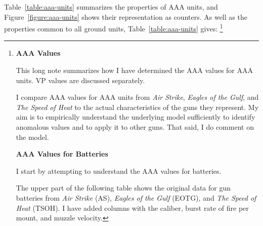 \documentclass[10pt]{article}
\newcommand{\note}[1]{%
    \footnote{%
        \setlength{\parindent}{0pt}%
        \setlength{\parskip}{\smallskipamount}%
        #1
    }%
}
\newcommand{\notesection}[1]{%
    \par{\bfseries #1}\par
}
\begin{document}
Table~\ref{table:aaa-units} summarizes the properties of AAA units, and Figure~\ref{figure:aaa-units} shows their representation as counters.
As well as the properties common to all ground units, Table~\ref{table:aaa-units} gives:%
\note{
    \notesection{AAA Values}

    This long note summarizes how I have determined the AAA values for AAA units. VP values are discussed separately.

    I compare AAA values for AAA units from \emph{Air Strike}, \emph{Eagles of the Gulf}, and \emph{The Speed of Heat} to the actual characteristics of the guns they represent. My aim is to empirically understand the underlying model sufficiently to identify anomalous values and to apply it to other guns. That said, I do comment on the model.

    \notesection{AAA Values for Batteries}

    I start by attempting to understand the AAA values for batteries.

    The upper part of the following table shows the original data for gun batteries from \emph{Air Strike} (AS), \emph{Eagles of the Gulf} (EOTG), and \emph{The Speed of Heat} (TSOH). I have added columns with the caliber, burst rate of fire per mount, and muzzle velocity.

}
\end{document}
